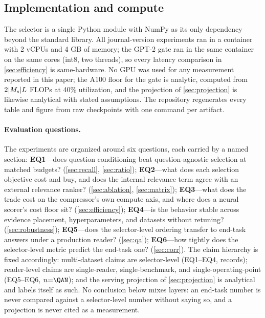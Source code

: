 \documentclass[pdflatex,sn-basic]{sn-jnl}
\DeclarePairedDelimiter\abs{\lvert}{\rvert}
\theoremstyle{remark}
\begin{document}
\subsection{Implementation and compute}
The selector is a single Python module with NumPy as its only
dependency beyond the standard library. All journal-version
experiments ran in a container with 2 vCPUs and 4 GB of memory; the
GPT-2 gate ran in the same container on the same cores (int8, two
threads), so every latency comparison in \autoref{sec:efficiency} is
same-hardware. No GPU was used for any measurement reported in this
paper; the A100 floor for the gate is analytic, computed from
$2\abs{M_s} L$ FLOPs at 40\% utilization, and the projection of
\autoref{sec:projection} is likewise analytical with stated
assumptions. The repository regenerates every table and figure from
raw checkpoints with one command per artifact.

\paragraph{Evaluation questions.}
The experiments are organized around six questions, each carried by a
named section: \textbf{EQ1}---does question conditioning beat
question-agnostic selection at matched budgets?
(\autoref{sec:recall}, \autoref{sec:ratio});
\textbf{EQ2}---what does each selection objective cost and buy, and
does the internal relevance term agree with an external relevance
ranker? (\autoref{sec:ablation}, \autoref{sec:matrix});
\textbf{EQ3}---what does the trade cost on the compressor's own
compute axis, and where does a neural scorer's cost floor sit?
(\autoref{sec:efficiency});
\textbf{EQ4}---is the behavior stable across evidence placement,
hyperparameters, and datasets without retuning?
(\autoref{sec:robustness});
\textbf{EQ5}---does the selector-level ordering transfer to end-task
answers under a production reader? (\autoref{sec:qa});
\textbf{EQ6}---how tightly does the selector-level metric predict
the end-task one? (\autoref{sec:corr}).
The claim hierarchy is fixed accordingly: multi-dataset claims are
selector-level (EQ1--EQ4, \TotalRecords{} records); reader-level
claims are single-reader, single-benchmark, and
single-operating-point (EQ5--EQ6, $n{=}\QAN$); and the serving
projection of \autoref{sec:projection} is analytical and labels itself
as such. No conclusion below mixes layers:
an end-task number is never compared against a selector-level number
without saying so, and a projection is never cited as a measurement.
\end{document}
